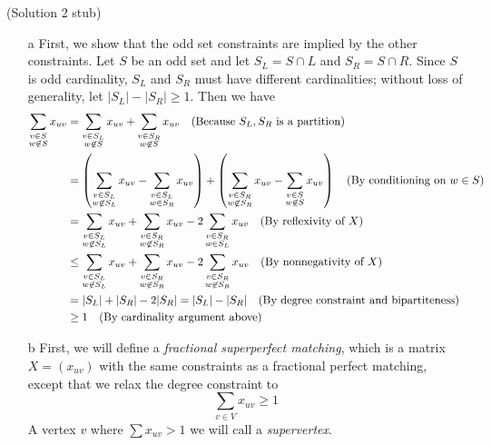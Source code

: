 \documentclass{hmcpset}
\begin{document}
\begin{solution}
(Solution 2 stub)
\begin{enumerate}
\item[a] 
First, we show that the odd set constraints are implied by the other constraints. Let $S$ be an odd set and let $S_L = S \cap L$ and $S_R = S \cap R$. Since $S$ is odd cardinality, $S_L$ and $S_R$ must have different cardinalities; without loss of generality, let $|S_L| - |S_R| \geq 1$. Then we have
\begin{align*}
\sum_{\substack{v \in S \\ w \not \in S}} x_{uv} &= \sum_{\substack{v \in S_L \\ w \not \in S}} x_{uv} + \sum_{\substack{v \in S_R \\ w \not \in S}} x_{uv} \text{\quad(Because $S_L,S_R$ is a partition)} \\
&= \left (\sum_{\substack{v \in S_L \\ w \not \in S_L}} x_{uv} - \sum_{\substack{v \in S_L \\ w \in S_R}} x_{uv}\right ) + \left (\sum_{\substack{v \in S_R \\ w \not \in S_R}} x_{uv} - \sum_{\substack{v \in S \\ w \not \in S}} x_{uv}\right ) \text{\quad (By conditioning on $w\in S$)} \\
&= \sum_{\substack{v \in S_L \\ w \not \in S_L}} x_{uv} + \sum_{\substack{v \in S_R \\ w \not \in S_R}} x_{uv} - 2\sum_{\substack{v \in S_R \\ w \in S_L}} x_{uv} \text{\quad (By reflexivity of $X$)}\\
&\leq \sum_{\substack{v \in S_L \\ w \not \in S_L}} x_{uv} + \sum_{\substack{v \in S_R \\ w \not \in S_R}} x_{uv} - 2\sum_{\substack{v \in S_R \\ w \not \in S_R}} x_{uv} \text {\quad (By nonnegativity of $X$)}\\
& = |S_L| + |S_R| - 2|S_R| = |S_L|-|S_R| \text{\quad (By degree constraint and bipartiteness)}\\
& \geq 1 \text {\quad (By cardinality argument above)}
\end{align*}
\item[b] First, we will define a \emph{fractional superperfect matching}, which is a matrix $X=(x_{uv})$ with the same constraints as a fractional perfect matching, except that we relax the degree constraint to
\[\sum_{v\in V} x_{uv} \geq 1\]
A vertex $v$ where $\sum x_{uv} > 1$ we will call a \emph{supervertex}.


\end{enumerate}
\end{solution}
\end{document}
